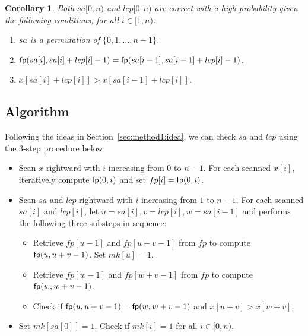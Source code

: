 \documentclass[10pt,journal,compsoc]{IEEEtran}
\newtheorem{Corollary}{Corollary}
\begin{document}
\begin{Corollary} \label{corollary:1}
	Both $sa[0, n)$ and $lcp[0, n)$ are correct with a high probability given the following conditions, for all $i \in [1, n)$:
	
	\begin{enumerate}[(1)]
		\item
		$sa$ is a permutation of $\{0, 1, \dots, n - 1\}$.
		
		\item
		${\sf fp}(sa[i], sa[i] + lcp[i] - 1) = {\sf fp}(sa[i - 1], sa[i - 1] + lcp[i] - 1)$.
		
		\item
		$x[sa[i] + lcp[i]] > x[sa[i - 1] + lcp[i]]$.
	\end{enumerate}
\end{Corollary}


\subsection{Algorithm} \label{sec:method1:algorithm}

Following the ideas in Section~\ref{sec:method1:idea}, we can check $sa$ and $lcp$ using the 3-step procedure below.

\begin{itemize}
	\item [S1]
	Scan $x$ rightward with $i$ increasing from $0$ to $n - 1$. For each scanned $x[i]$, iteratively compute ${\sf fp}(0, i)$ and set $fp[i] = {\sf fp}(0, i)$.
	
	\item [S2]
	Scan $sa$ and $lcp$ rightward with $i$ increasing from $1$ to $n - 1$. For each scanned $sa[i]$ and $lcp[i]$, let $u = sa[i], v = lcp[i], w = sa[i - 1]$ and performs the following three substeps in sequence:
	
	\begin{itemize}
		\item [(a)] 
		Retrieve $fp[u - 1]$ and $fp[u + v - 1]$ from $fp$ to compute ${\sf fp}(u, u + v - 1)$. Set $mk[u] = 1$.
		
		\item [(b)] 
		Retrieve $fp[w - 1]$ and $fp[w + v - 1]$ from $fp$ to compute ${\sf fp}(w, w + v - 1)$. 
		
		\item [(c)] 
		Check if ${\sf fp}(u, u + v - 1) = {\sf fp}(w, w + v - 1)$ and $x[u + v] > x[w + v]$.
	\end{itemize}

	\item [S3] Set $mk[sa[0]] = 1$. Check if $mk[i] = 1$ for all $i \in [0, n)$.
	
\end{itemize}
\end{document}

